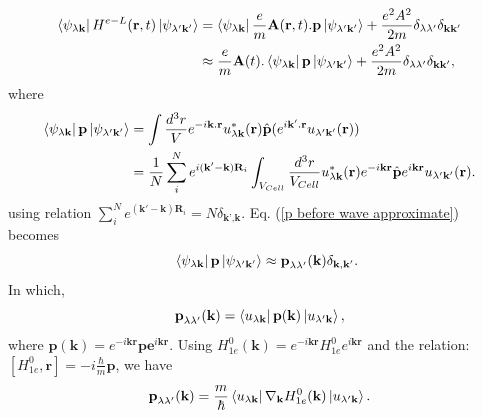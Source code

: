 \documentclass[12pt,english,a4paper]{article}
\begin{document}
	\begin{align}
		\bra{\psi_{\lambda\textbf{k}}}H^{e-L}(\textbf{r},t)\ket{\psi_{\lambda'\textbf{k}'}} &= \bra{\psi_{\lambda\textbf{k}}}\frac{e}{m}\textbf{A}(\textbf{r},t).\textbf{p}\ket{\psi_{\lambda'\textbf{k}'}} +\frac{e^2 A^2}{2m} \delta_{\lambda \lambda'}\delta_{\textbf{k}\textbf{k}'} \nonumber\\
		&\approx \frac{e}{m}\textbf{A}(t). \bra{\psi_{\lambda\textbf{k}}}\textbf{p}\ket{\psi_{\lambda'\textbf{k}'}} + \frac{e^2 A^2}{2m} \delta_{\lambda \lambda'}\delta_{\textbf{k}\textbf{k}'},
	\end{align}
where
	\begin{align}
		\bra{\psi_{\lambda\textbf{k}}}\textbf{p}\ket{\psi_{\lambda'\textbf{k}'}} &= \int \frac{d^3 r}{V} e^{-i\textbf{k}.\textbf{r}}u^{*}_{\lambda \textbf{k}}(\textbf{r}) \hat{\textbf{p}}(e^{i\textbf{k}'.\textbf{r}} u_{\lambda'\textbf{k}'}(\textbf{r})) \nonumber \\
		\label{p before wave approximate}
		& = \frac{1}{N} \sum_{i}^{N} e^{i(\textbf{k}'-\textbf{k})\textbf{R}_i} \int_{V_{Cell}} \frac{d^3r}{V_{Cell}}u^{*}_{\lambda \textbf{k}}(\textbf{r}) e^{-i\textbf{k}\textbf{r}}\hat{\textbf{p}} e^{i\textbf{k}\textbf{r}} u_{\lambda'\textbf{k}'}(\textbf{r}).
	\end{align}
	\quad using relation $
\sum_{i}^{N} e^{(\textbf{k}'-\textbf{k})\textbf{R}_i}= N\delta_{\textbf{k'},\textbf{k}}$. Eq. (\ref{p before wave approximate}) becomes
	\begin{equation}
		\label{p after LWA}
		\quad \bra{\psi_{\lambda\textbf{k}}}\textbf{p}\ket{\psi_{\lambda'\textbf{k}'}} \approx \textbf{p}_{\lambda\lambda'}(\textbf{k}) \delta_{\textbf{k}, \textbf{k}'}.
	\end{equation}
\quad In which,
	\begin{equation}
		\textbf{p}_{\lambda\lambda'}(\textbf{k}) = \bra{u_{\lambda\textbf{k}}}\textbf{p}(\textbf{k})\ket{u_{\lambda'\textbf{k}}},
	\end{equation}
\quad where $\textbf{p}(\textbf{k}) = e^{-i\textbf{k}\textbf{r}} \textbf{p} \textbf{e}^{i\textbf{k}\textbf{r}}$. Using $H^0_{1e}(\textbf{k})= e^{-i\textbf{k}\textbf{r}} H^{0}_{1e} e^{i\textbf{k}\textbf{r}}$ and the relation: $[H^0_{1e},\textbf{r}] = -i\frac{\hbar}{m}\textbf{p}$, we have
	\begin{equation}
		\label{momentum}
		\textbf{p}_{\lambda\lambda'}(\textbf{k}) = \frac{m}{\hbar} \bra{u_{\lambda \textbf{k}}} \nabla_{\textbf{k}}H^0_{1e}(\textbf{k}) \ket{u_{\lambda'\textbf{k}}}.
	\end{equation}
\end{document}

